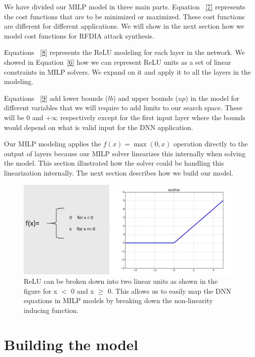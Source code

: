 We have divided our \ac{MILP} model in three main parts. 
Equation ~\ref{7} represents the cost functions that are to be minimized or maximized.
These cost functions are different for different applications.  
We will show in the next section how we model cost functions for \ac{RFDIA}
attack synthesis. 

Equations ~\ref{8} represents the ReLU modeling for each layer in the network. 
We showed in Equation~\ref{6} how we can represent ReLU units as a set of linear constraints in \ac{MILP} solvers. 
We expand on it and apply it to all the layers in the modeling. 

Equations ~\ref{9} add lower bounds ($lb$) and upper bounds ($up$) in the  model for different variables that we will  require to add limits to our search space.  
These will be 0 and $+\infty$ respectively except for the first input layer
where the bounds would depend on what is valid input for the DNN application.

Our MILP modeling applies the $f(x) = \max(0, x)$ operation directly to the output of layers because our MILP solver linearizes this internally when solving the model.
This section illustrated how the solver could be handling this linearization internally. The next section describes how we build our model.




\begin{figure}
	\centering
	\includegraphics[width=0.7\linewidth]{Images/ReLUbreakdown}
	\caption{ReLU can be broken down into two linear units as shown in the figure for x $<$ 0 and x $\geq$ 0. This allows us to easily map the DNN equations in MILP models by breaking down the non-linearity inducing function.}
	\label{fig:relubreakdown}
\end{figure}

\section{Building the model}
\label{section:attacks}

